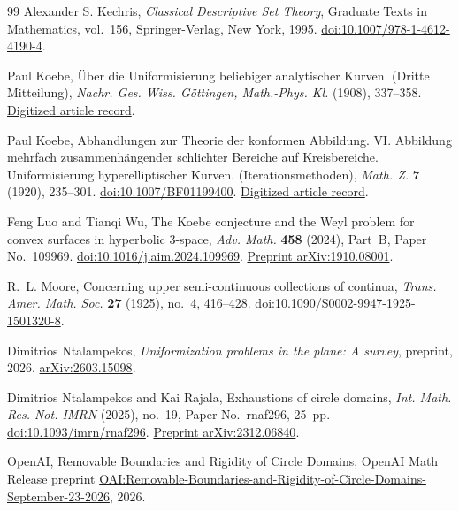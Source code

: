 \begin{thebibliography}{99}
Alexander S. Kechris,
\emph{Classical Descriptive Set Theory},
Graduate Texts in Mathematics, vol.~156,
Springer-Verlag, New York, 1995.
\href{https://doi.org/10.1007/978-1-4612-4190-4}{doi:10.1007/978-1-4612-4190-4}.

Paul Koebe,
\"Uber die Uniformisierung beliebiger analytischer Kurven.
(Dritte Mitteilung),
\emph{Nachr. Ges. Wiss. G\"ottingen, Math.-Phys. Kl.}
(1908), 337--358.
\href{https://eudml.org/doc/58725}{Digitized article record}.

Paul Koebe,
Abhandlungen zur Theorie der konformen Abbildung.
VI. Abbildung mehrfach zusammenh\"angender schlichter Bereiche
auf Kreisbereiche. Uniformisierung hyperelliptischer Kurven.
(Iterationsmethoden),
\emph{Math. Z.} \textbf{7} (1920), 235--301.
\href{https://doi.org/10.1007/BF01199400}{doi:10.1007/BF01199400}.
\href{https://eudml.org/doc/167583}{Digitized article record}.

Feng Luo and Tianqi Wu,
The Koebe conjecture and the Weyl problem for convex surfaces
in hyperbolic 3-space,
\emph{Adv. Math.} \textbf{458} (2024), Part~B,
Paper No.~109969.
\href{https://doi.org/10.1016/j.aim.2024.109969}
{doi:10.1016/j.aim.2024.109969}.
\href{https://arxiv.org/abs/1910.08001}{Preprint arXiv:1910.08001}.

R.~L. Moore,
Concerning upper semi-continuous collections of continua,
\emph{Trans. Amer. Math. Soc.} \textbf{27} (1925), no.~4, 416--428.
\href{https://doi.org/10.1090/S0002-9947-1925-1501320-8}
{doi:10.1090/S0002-9947-1925-1501320-8}.

Dimitrios Ntalampekos,
\emph{Uniformization problems in the plane: A survey},
preprint, 2026.
\href{https://arxiv.org/abs/2603.15098}{arXiv:2603.15098}.

Dimitrios Ntalampekos and Kai Rajala,
Exhaustions of circle domains,
\emph{Int. Math. Res. Not. IMRN} (2025), no.~19,
Paper No.~rnaf296, 25~pp.
\href{https://doi.org/10.1093/imrn/rnaf296}{doi:10.1093/imrn/rnaf296}.
\href{https://arxiv.org/abs/2312.06840}{Preprint arXiv:2312.06840}.

OpenAI,
Removable Boundaries and Rigidity of Circle Domains,
OpenAI Math Release preprint
\href{https://github.com/openai/math/blob/main/preprints/Removable-Boundaries-and-Rigidity-of-Circle-Domains-September-23-2026/paper.pdf}{OAI:Removable-Boundaries-and-Rigidity-of-Circle-Domains-September-23-2026},
2026.


\end{thebibliography}
